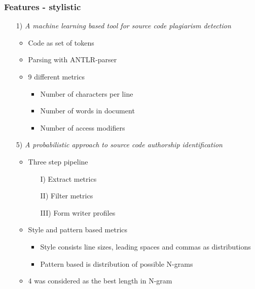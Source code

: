 \documentclass[t,12pt,pdftex]{beamer}
\begin{document}
\begin{frame}
	\frametitle{Features - stylistic}
	\begin{itemize}
		\item[1)] \textit{A machine learning based tool
for source code plagiarism detection}
		\begin{itemize}
			\item Code as set of tokens
			\item Parsing with ANTLR-parser
			\item 9 different metrics
			\begin{itemize}
				\item Number of characters per line
				\item Number of words in document
				\item Number of access modifiers	
			\end{itemize}
		\end{itemize}
	\end{itemize}
\end{frame}

\begin{frame}
	\vspace{0.5in}
	\begin{itemize}
		\item[5)] \textit{A probabilistic approach to source code authorship identification}
		\begin{itemize}
			\item Three step pipeline
			\begin{itemize}
				\item[I)] Extract metrics
				\item[II)] Filter metrics
				\item[III)] Form writer profiles
			\end{itemize}
			\item Style and pattern based metrics
			\begin{itemize}
				\item Style consists line sizes, leading spaces and commas as distributions
				\item Pattern based is distribution of possible N-grams
			\end{itemize}
			\item 4 was considered as the best length in N-gram
		\end{itemize}
	\end{itemize}
\end{frame}
\end{document}
